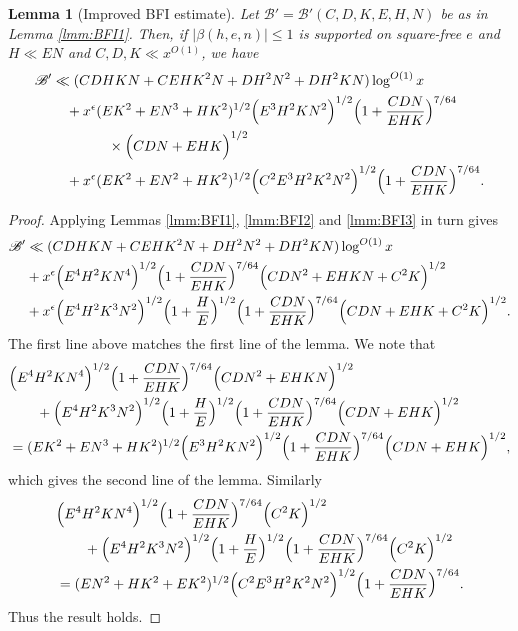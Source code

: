\documentclass[10pt]{amsart}
\theoremstyle{plain}
\newtheorem{lmm}[thrm]{Lemma}
\numberwithin{equation}{section}
\begin{document}
%
%
%
%
%
%
%
%
\begin{lmm}[Improved BFI estimate]\label{lmm:BFICombined}
Let $\mathscr{B}'=\mathscr{B}'(C,D,K,E,H,N)$ be as in Lemma \ref{lmm:BFI1}. Then, if $|\beta(h,e,n)|\le 1$ is supported on square-free $e$ and $H\ll EN$ and $C,D,K\ll x^{O(1)}$, we have
\begin{align*}
\mathscr{B}'&\ll (C D H K N+C E H K^2 N+D H^2 N^2+DH^2KN)\log^{O(1)}{x}\\
&\quad+x^\epsilon (E K^2+EN^3+H K^2)^{1/2}\Bigl(E^3 H^2 K N^2\Bigr)^{1/2}\Bigl(1+\frac{C D N}{E H K}\Bigr)^{7/64}\\
&\qquad\qquad\times \Bigl( C D N +E H K\Bigr)^{1/2} \\
&\quad+x^\epsilon (E K^2 +E N^2+H K^2)^{1/2}\Bigl(C^2 E^3 H^2 K^2 N^2\Bigr)^{1/2}\Bigl(1+\frac{C D N}{E H K}\Bigr)^{7/64}.
\end{align*}
\end{lmm}
%
%
%
%
\begin{proof}
Applying Lemmas \ref{lmm:BFI1}, \ref{lmm:BFI2} and \ref{lmm:BFI3} in turn gives
\begin{align*}
\mathscr{B}'&\ll (C D H K N + C E H K^2 N+D H^2 N^2+D H^2 K N)\log^{O(1)}{x}\\
&+ x^\epsilon\Bigl(E^{4} H^2 K N^{4}\Bigr)^{1/2}\Bigl(1+\frac{C D N}{E H K}\Bigr)^{7/64}\Bigl(C D N^2+ E H K N+C^2 K\Bigr)^{1/2} \\
&+x^\epsilon\Bigl(E^4 H^2 K^3 N^2\Bigr)^{1/2}\Bigl(1+\frac{H}{E}\Bigr)^{1/2}\Bigl(1+\frac{C D N}{E H K}\Bigr)^{7/64}\Bigl(C D N+ E H K+C^2 K\Bigr)^{1/2}.
\end{align*}
The first line above matches the first line of the lemma. We note that
\begin{align*}
&\Bigl(E^4 H^2 K N^{4}\Bigr)^{1/2}\Bigl(1+\frac{C D N}{E H K}\Bigr)^{7/64}\Bigl( C D N^2+ E H K N\Bigr)^{1/2}\\
&\qquad+\Bigl(E^4 H^2 K^3 N^2\Bigr)^{1/2}\Bigl(1+\frac{H}{E}\Bigr)^{1/2}\Bigl(1+\frac{C D N}{E H K}\Bigr)^{7/64}\Bigl(C D N+ E H K\Bigr)^{1/2}\\
&=  (E K^2+EN^3+H K^2)^{1/2}\Bigl(E^3 H^2 K N^2\Bigr)^{1/2}\Bigl(1+\frac{C D N}{E H K}\Bigr)^{7/64}\Bigl( C D N +E H K\Bigr)^{1/2},
\end{align*}
which gives the second line of the lemma. Similarly
\begin{align*}
&\Bigl(E^{4} H^2 K N^{4}\Bigr)^{1/2}\Bigl(1+\frac{C D N}{E H K}\Bigr)^{7/64}\Bigl(C^2 K\Bigr)^{1/2} \\
& \qquad+\Bigl(E^4 H^2 K^3 N^2\Bigr)^{1/2}\Bigl(1+\frac{H}{E}\Bigr)^{1/2} \Bigl(1+\frac{CD N}{E H K}\Bigr)^{7/64}
\Bigl(C^2 K\Bigr)^{1/2}\\
&=(E N^2 + H K^2+EK^2)^{1/2}\Bigl(C^2 E^3 H^2 K^2 N^2\Bigr)^{1/2}\Bigl(1+\frac{C D N}{E H K}\Bigr)^{7/64}.
\end{align*}
Thus the result holds.
\end{proof}
\end{document}
